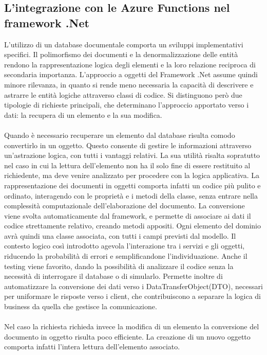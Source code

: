 \subsection{L'integrazione con le Azure Functions nel framework .Net}
L'utilizzo di un database documentale comporta un sviluppi implementativi specifici.
Il polimorfismo dei documenti e la denormalizzazione delle entità
rendono la rappresentazione logica degli elementi e la loro relazione reciproca di secondaria importanza.
L'approccio a oggetti del Framework .Net assume quindi minore rilevanza,
in quanto si rende meno necessaria la capacità di descrivere e astrarre 
le entità logiche attraverso classi di codice.
Si distinguono però due tipologie di richieste principali, 
che determinano l'approccio apportato verso i dati:
la recupera di un elemento e la sua modifica.\\
\\
Quando è necessario recuperare un elemento dal database risulta comodo 
convertirlo in un oggetto.
Questo consente di gestire le informazioni attraverso un'astrazione logica, con tutti i vantaggi relativi.
La sua utilità risalta sopratutto nel caso in cui la lettura dell'elemento 
non ha il solo fine di essere restituito al richiedente,
ma deve venire analizzato per procedere con la logica applicativa.
La rappresentazione dei documenti in oggetti comporta infatti un codice più pulito e ordinato, 
interagendo con le proprietà e i metodi della classe, senza entrare nella complessità computazionale 
dell'elaborazione del documento. 
La conversione viene svolta automaticamente dal framework, 
e permette di associare ai dati il codice strettamente relativo, creando metodi appositi.
Ogni elemento del dominio avrà quindi una classe associata,
con tutti i campi previsti dal modello.
Il contesto logico così introdotto agevola l'interazione tra i servizi e gli oggetti,
riducendo la probabilità di errori e semplificandone l'individuazione.
Anche il testing viene favorito, dando la possibilità di analizzare il codice 
senza la necessità di interrogare il database o di simularlo.
Permette inoltre di automatizzare la conversione dei dati verso i DataTransferObject(DTO), 
necessari per uniformare le risposte verso i client, 
che contribuiscono a separare la logica di business da quella che gestisce la comunicazione.\\
\\
Nel caso la richiesta richieda invece la modifica di un elemento 
la conversione del documento in oggetto risulta poco efficiente.
La creazione di un nuovo oggetto comporta infatti l'intera lettura dell'elemento associato.
